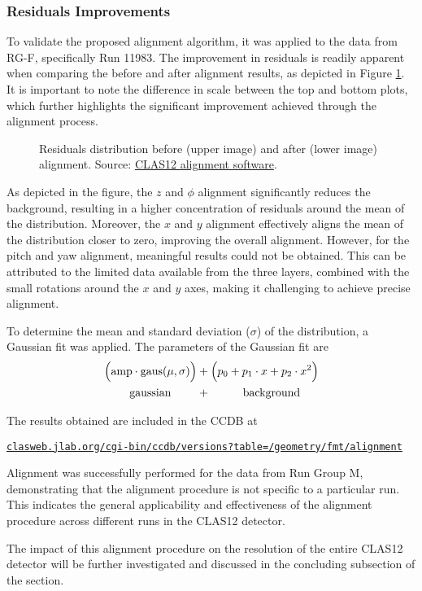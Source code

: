 \subsubsection{Residuals Improvements}
\label{12.22::residuals_improvements}
    To validate the proposed alignment algorithm, it was applied to the data from RG-F, specifically Run 11983.
    The improvement in residuals is readily apparent when comparing the before and after alignment results, as depicted in Figure \ref{fig::12.22::fmt_residuals_comparison}.
    It is important to note the difference in scale between the top and bottom plots, which further highlights the significant improvement achieved through the alignment process.

    \begin{figure}[t!]
        \centering{}
        \caption[Residuals distribution improvement.]{Residuals distribution before (upper image) and after (lower image) alignment.
        Source: \href{https://github.com/JeffersonLab/clas12alignment}{CLAS12 alignment software}.}
        \label{fig::12.22::fmt_residuals_comparison}
    \end{figure}

    As depicted in the figure, the $z$ and $\phi$ alignment significantly reduces the background, resulting in a higher concentration of residuals around the mean of the distribution.
    Moreover, the $x$ and $y$ alignment effectively aligns the mean of the distribution closer to zero, improving the overall alignment.
    However, for the pitch and yaw alignment, meaningful results could not be obtained.
    This can be attributed to the limited data available from the three layers, combined with the small rotations around the $x$ and $y$ axes, making it challenging to achieve precise alignment.

    To determine the mean and standard deviation ($\sigma$) of the distribution, a Gaussian fit was applied. The parameters of the Gaussian fit are
     \begin{align*}
        \Big( \text{amp} \cdot \text{gaus}(\mu, \sigma) \Big) &+ \Big( p_0 + p_1\cdot x + p_2\cdot x^2 \Big) \\
        \text{gaussian} \hspace{0.8cm} &+ \hspace{1cm} \text{background}
    \end{align*}

    The results obtained are included in the CCDB at

    \small\href{https://clasweb.jlab.org/cgi-bin/ccdb/versions?table=/geometry/fmt/alignment}{\texttt{clasweb.jlab.org/cgi-bin/ccdb/versions?table=/geometry/fmt/alignment}}

    Alignment was successfully performed for the data from Run Group M, demonstrating that the alignment procedure is not specific to a particular run.
    This indicates the general applicability and effectiveness of the alignment procedure across different runs in the CLAS12 detector.

    The impact of this alignment procedure on the resolution of the entire CLAS12 detector will be further investigated and discussed in the concluding subsection of the section.
